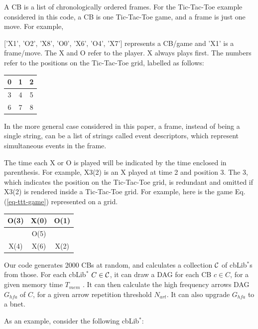 \documentclass[12pt]{article}
\begin{document}
A CB is a list of 
chronologically ordered frames. For the Tic-Tac-Toe example considered in 
this code, a CB is one Tic-Tac-Toe game, and a frame is just one move. For example, 

\beq\rm
['X1',\; 'O2',\; 'X8',\; 'O0',\; 'X6',\;
 'O4',\; 'X7']
\label{eq-ttt-game} 
\eeq
represents a 
CB/game and 'X1' is a frame/move. The X and O refer to the player. X always 
plays first. The numbers refer to the positions on the Tic-Tac-Toe grid, 
labelled as follows: 
\beq
\setlength\arrayrulewidth{2pt}\begin{tabular}{c|c|c}0&1&2\\\hline 3&4&5\\\hline 6&7&8\end{tabular}    
    \eeq

In the more general case considered in this paper, a frame, instead of being 
a single string, can be a list of strings called event descriptors, 
which represent simultaneous events in the frame. 

The time each X or O is played will be indicated by the time enclosed in
    parenthesis. For example, X3(2) is an X played at time 2 and position 3.
    The 3, which indicates the position on the Tic-Tac-Toe grid,
    is redundant and omitted if X3(2) is rendered inside a Tic-Tac-Toe grid.
    For example, here is the game Eq.(\ref{eq-ttt-game})
    represented on a grid.
    
    \beq
\setlength\arrayrulewidth{2pt}\begin{tabular}{c|c|c}O(3)&X(0)&O(1)\\\hline &O(5)&\\\hline X(4)&X(6)&X(2)\end{tabular}    
    \eeq
    
Our code generates
2000  CBs at random, 
and calculates a collection ${\cal C}$ 
of cbLib$^*$s from 
those. For each cbLib$^*$ $C\in {\cal C}$, 
it can draw a DAG 
for each CB $c\in C$,
for a given memory time
$T_{mem}$ .
It can then calculate 
the high frequency arrows DAG
$G_{hfa}$ of $C$, for
a given arrow repetition threshold $N_{art}$.
It can also upgrade $G_{hfa}$
to a bnet. 

As an example, consider the following
cbLib$^*$:
\end{document}
